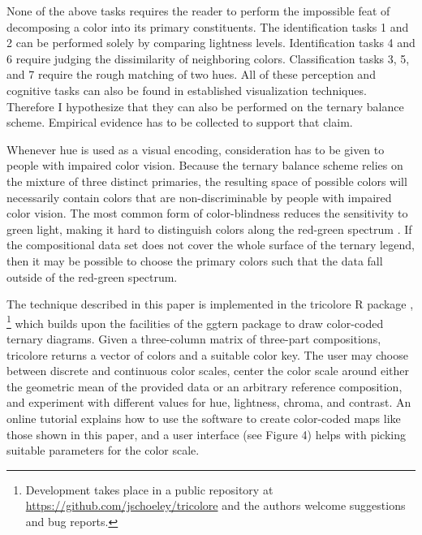 \documentclass[10pt,twoside,reqno]{article}
\let\oldfootnote\footnote
\renewcommand\footnote[1]{%
\oldfootnote{\hspace{0.6mm}#1}}
\begin{document}
None of the above tasks requires the reader to perform the impossible
feat of decomposing a color into its primary constituents. The
identification tasks 1 and 2 can be performed solely by comparing
lightness levels. Identification tasks 4 and 6 require judging the
dissimilarity of neighboring colors. Classification tasks 3, 5, and 7
require the rough matching of two hues. All of these perception and
cognitive tasks can also be found in established visualization
techniques. Therefore I hypothesize that they can also be performed on
the ternary balance scheme. Empirical evidence has to be collected to
support that claim.

Whenever hue is used as a visual encoding, consideration has to be given
to people with impaired color vision. Because the ternary balance scheme
relies on the mixture of three distinct primaries, the resulting space
of possible colors will necessarily contain colors that are
non-discriminable by people with impaired color vision. The most common
form of color-blindness reduces the sensitivity to green light, making
it hard to distinguish colors along the red-green spectrum
\citep{Birch2012}. If the compositional data set does not cover the
whole surface of the ternary legend, then it may be possible to choose
the primary colors such that the data fall outside of the red-green
spectrum.

The technique described in this paper is implemented in the tricolore R
package \citep{Schoeley2019a},\footnote{Development takes place in a
  public repository at \url{https://github.com/jschoeley/tricolore} and
  the authors welcome suggestions and bug reports.} which builds upon
the facilities of the ggtern package \citep{Hamilton2018} to draw
color-coded ternary diagrams. Given a three-column matrix of three-part
compositions, tricolore returns a vector of colors and a suitable color
key. The user may choose between discrete and continuous color scales,
center the color scale around either the geometric mean of the provided
data or an arbitrary reference composition, and experiment with
different values for hue, lightness, chroma, and contrast. An online
tutorial \citep{Schoeley2019b} explains how to use the software to
create color-coded maps like those shown in this paper, and a user
interface (see Figure 4) helps with picking suitable parameters for the
color scale.
\end{document}
